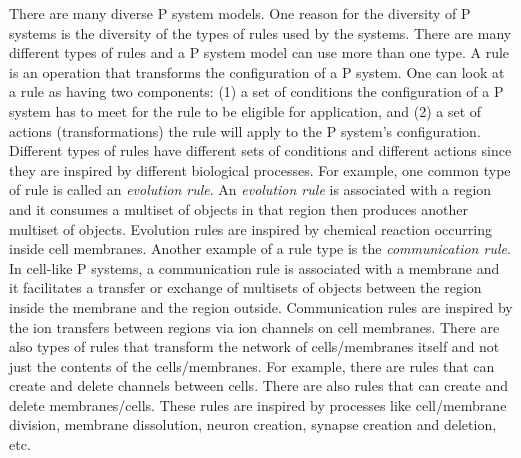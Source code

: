 \documentclass[a4paper]{article}
\theoremstyle{definition}
\begin{document}
There are many diverse P system models.  One reason for the diversity of P systems is the diversity 
of the types of rules used by the systems. There are many different types of rules and a P system 
model can use more than one type.  A rule is an operation that transforms the configuration of a P 
system. One can look at a rule as having two components: (1) a set of conditions the configuration 
of a P system has to meet for the rule to be eligible for application, and (2) a set of actions 
(transformations) the rule will apply to the P system's configuration. Different types of rules have
different sets of conditions and different actions since they are inspired by different biological 
processes. For example, one common type of rule is called an \emph{evolution rule}. An 
\emph{evolution rule} is associated with a region and it consumes a multiset of objects in that 
region then produces another multiset of objects. Evolution rules are inspired by chemical reaction 
occurring inside cell membranes. Another example of a rule type is the \emph{communication rule}. In 
cell-like P systems, a communication rule is associated with a membrane and it facilitates a 
transfer or exchange of multisets of objects between the region inside the membrane and the region 
outside. Communication rules are inspired by the ion transfers between regions via ion channels on 
cell membranes. There are also types of rules that transform the network of cells/membranes itself 
and not just the contents of the  cells/membranes. For example, there are rules that can create and 
delete channels between cells. There are also rules that can create and delete membranes/cells. 
These rules are inspired by processes like cell/membrane division, membrane dissolution, neuron 
creation, synapse creation and deletion, etc.
\end{document}
